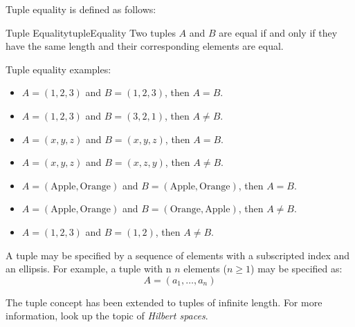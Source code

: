 Tuple equality is defined as follows:
\begin{definition}{Tuple Equality}{tupleEquality}
  Two tuples \( A \) and \( B \) are equal if and only if they have the same length and 
  their corresponding elements are equal.
\end{definition}
Tuple equality examples:
\begin{itemize}
  \item \( A = (1, 2, 3) \) and \( B = (1, 2, 3) \), then \( A = B \).
  \item \( A = (1, 2, 3) \) and \( B = (3, 2, 1) \), then \( A \neq B \).
  \item \( A = (x, y, z) \) and \( B = (x, y, z) \), then \( A = B \).
  \item \( A = (x, y, z) \) and \( B = (x, z, y) \), then \( A \neq B \).
  \item \( A = (\text{Apple}, \text{Orange}) \) and \( B = (\text{Apple}, \text{Orange}) \), then \( A = B \).
  \item \( A = (\text{Apple}, \text{Orange}) \) and \( B = (\text{Orange}, \text{Apple}) \), then \( A \neq B \).
  \item \( A = (1, 2, 3) \) and \( B = (1, 2) \), then \( A \neq B \).
\end{itemize}

A tuple may be specified by a sequence of elements with a subscripted index and an ellipsis. 
For example, a tuple with n
\(n\) elements (\( n \ge 1\)) may be specified as:
\[
  A = (a_1, \ldots, a_n) 
\]

\begin{advancedTopic}
  The tuple concept has been extended to tuples of infinite length. For more
  information, look up the topic of \emph{Hilbert spaces}.
\end{advancedTopic}
